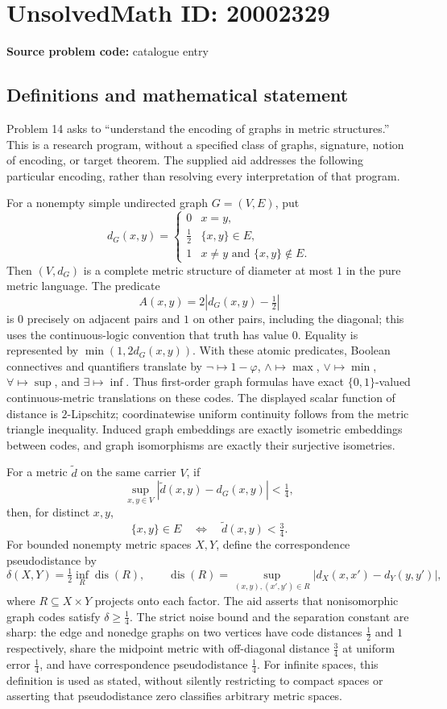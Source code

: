\documentclass[11pt]{article}
\begin{document}
\section*{UnsolvedMath ID: 20002329}
\textbf{Source problem code:} catalogue entry
\subsection{Definitions and mathematical statement}
Problem 14 asks to ``understand the encoding of graphs in metric structures.'' This is a research program, without a specified class of graphs, signature, notion of encoding, or target theorem. The supplied aid addresses the following particular encoding, rather than resolving every interpretation of that program.

For a nonempty simple undirected graph $G=(V,E)$, put
\[
d_G(x,y)=\begin{cases}0&x=y,\\ \tfrac12&\{x,y\}\in E,\\1&x\ne y\text{ and }\{x,y\}\notin E.\end{cases}
\]
Then $(V,d_G)$ is a complete metric structure of diameter at most $1$ in the pure metric language. The predicate
\[
A(x,y)=2\left|d_G(x,y)-\tfrac12\right|
\]
is $0$ precisely on adjacent pairs and $1$ on other pairs, including the diagonal; this uses the continuous-logic convention that truth has value $0$. Equality is represented by $\min(1,2d_G(x,y))$. With these atomic predicates, Boolean connectives and quantifiers translate by $\neg\mapsto1-\varphi$, $\wedge\mapsto\max$, $\vee\mapsto\min$, $\forall\mapsto\sup$, and $\exists\mapsto\inf$. Thus first-order graph formulas have exact $\{0,1\}$-valued continuous-metric translations on these codes. The displayed scalar function of distance is $2$-Lipschitz; coordinatewise uniform continuity follows from the metric triangle inequality. Induced graph embeddings are exactly isometric embeddings between codes, and graph isomorphisms are exactly their surjective isometries.

For a metric $\widetilde d$ on the same carrier $V$, if
\[
\sup_{x,y\in V}|\widetilde d(x,y)-d_G(x,y)|<\tfrac14,
\]
then, for distinct $x,y$,
\[
\{x,y\}\in E\quad\Longleftrightarrow\quad\widetilde d(x,y)<\tfrac34.
\]
For bounded nonempty metric spaces $X,Y$, define the correspondence pseudodistance by
\[
\delta(X,Y)=\tfrac12\inf_R\operatorname{dis}(R),\qquad
\operatorname{dis}(R)=\sup_{(x,y),(x',y')\in R}|d_X(x,x')-d_Y(y,y')|,
\]
where $R\subseteq X\times Y$ projects onto each factor. The aid asserts that nonisomorphic graph codes satisfy $\delta\geq\tfrac14$. The strict noise bound and the separation constant are sharp: the edge and nonedge graphs on two vertices have code distances $\tfrac12$ and $1$ respectively, share the midpoint metric with off-diagonal distance $\tfrac34$ at uniform error $\tfrac14$, and have correspondence pseudodistance $\tfrac14$. For infinite spaces, this definition is used as stated, without silently restricting to compact spaces or asserting that pseudodistance zero classifies arbitrary metric spaces.
\end{document}
